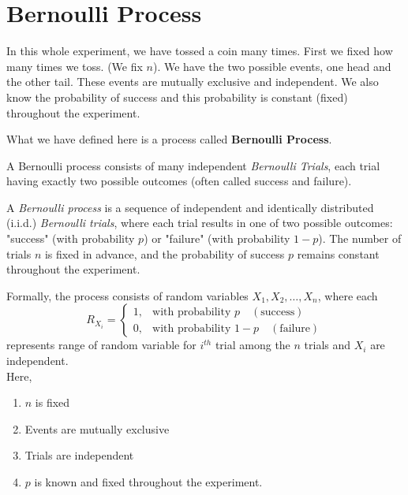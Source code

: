 \section{Bernoulli Process}
\label{sec:bernoulli-process}
In this whole experiment, we have tossed a coin many times.
First we fixed how many times we toss. (We fix \(n\)). We
have the two possible events, one head and the other tail.
These events are mutually exclusive and independent. We also
know the probability of success and this probability is
constant (fixed) throughout the experiment.

What we have defined here is a process called
\textbf{Bernoulli Process}.

\begin{remark}
  A Bernoulli process consists of many independent \emph{Bernoulli Trials},
  each trial having exactly two possible outcomes (often
  called success and failure).
\end{remark}

\begin{definition}
  \label{def:bernoulli-process}
  A \emph{Bernoulli process} is a sequence of independent
  and identically distributed (i.i.d.) \emph{Bernoulli trials},
  where each trial results in one of two possible outcomes:
  "success" (with probability \(p\)) or "failure" (with
  probability \(1-p\)). The number of trials \(n\) is fixed
  in advance, and the probability of success \(p\) remains
  constant throughout the experiment.

  Formally, the process consists of random variables \(X_1,
  X_2, \ldots, X_n\), where each
  \[
    R_{X_i} = 
    \begin{cases}
      1, & \text{with probability } p \quad (\text{success}) \\
      0, & \text{with probability } 1-p \quad (\text{failure})
    \end{cases}
  \]
  represents range of random variable for \(i^{th}\) trial among the \(n\)
  trials and \(X_i\) are independent.\\

  Here,
  \begin{enumerate}
    \item \(n\) is fixed
    \item Events are mutually exclusive
    \item Trials are independent
    \item \(p\) is known and fixed throughout the
      experiment.
  \end{enumerate}
\end{definition}
